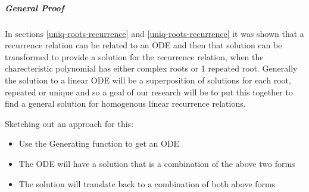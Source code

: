 \documentclass[11pt]{article}
\begin{document}
\subparagraph{General Proof}
\label{general-gen-func-proof}
In sections \ref{uniq-roots-recurrence} and \ref{uniq-roots-recurrence}
it was shown that a recurrence relation can be related to an ODE and then that
solution can be transformed to provide a solution for the recurrence relation,
when the charecteristic polynomial has either complex roots or 1 repeated root.
Generally the solution to a linear ODE will be a superposition of solutions for
each root, repeated or unique and so a goal of our research will be to put this
together to find a general solution for homogenous linear recurrence relations.

Sketching out an approach for this:

\begin{itemize}
\item Use the Generating function to get an ODE
\item The ODE will have a solution that is a combination of the above two forms
\item The solution will translate back to a combination of both above forms
\end{itemize}
\end{document}
